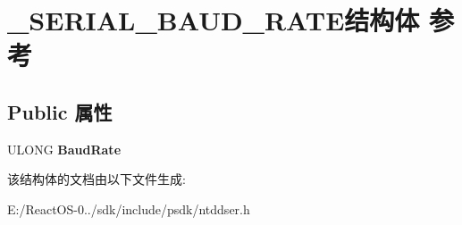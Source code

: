 \hypertarget{struct___s_e_r_i_a_l___b_a_u_d___r_a_t_e}{}\section{\+\_\+\+S\+E\+R\+I\+A\+L\+\_\+\+B\+A\+U\+D\+\_\+\+R\+A\+T\+E结构体 参考}
\label{struct___s_e_r_i_a_l___b_a_u_d___r_a_t_e}
\subsection*{Public 属性}
\begin{DoxyCompactItemize}
\item 
\mbox{\label{struct___s_e_r_i_a_l___b_a_u_d___r_a_t_e_a6704c9a955197ae924327d30a273bd9e}} 
U\+L\+O\+NG {\bfseries Baud\+Rate}
\end{DoxyCompactItemize}


该结构体的文档由以下文件生成\+:\begin{DoxyCompactItemize}
\item 
E\+:/\+React\+O\+S-\/0../sdk/include/psdk/ntddser.\+h\end{DoxyCompactItemize}
